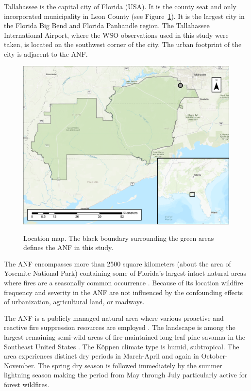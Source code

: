 \documentclass[12pt]{iopart}
\begin{document}
Tallahassee is the capital city of Florida (USA). It is the county seat and only incorporated municipality in Leon County (see Figure~\ref{ANFMap}). It is the largest city in the Florida Big Bend and Florida Panhandle region. The Tallahassee International Airport, where the WSO observations used in this study were taken, is located on the southwest corner of the city. The urban footprint of the city is adjacent to the ANF.
\begin{figure}[t]
\noindent\includegraphics[scale=.45,trim=0in 1in 0in 0in,clip]{ANFMap.pdf}\\
\vspace{0in}
\caption{Location map. The black boundary surrounding the green areas defines the ANF in this study.}
\label{ANFMap}
\end{figure}

The ANF encompasses more than 2500 square kilometers (about the area of Yosemite National Park) containing some of Florida’s largest intact natural areas where fires are a seasonally common occurrence \citep{Ferguson1998}. Because of its location wildfire frequency and severity in the ANF are not influenced by the confounding effects of urbanization, agricultural land, or roadways. 

The ANF is a publicly managed natural area where various proactive and reactive fire suppression resources are employed \citep{James2006}. The landscape is among the largest remaining semi-wild areas of fire-maintained long-leaf pine savanna in the Southeast United States \citep{Trager2018}. The Köppen climate type is humid, subtropical. The area experiences distinct dry periods in March-April and again in October-November. The spring dry season is followed immediately by the summer lightning season making the period from May through July particularly active for forest wildfires. 
\end{document}
